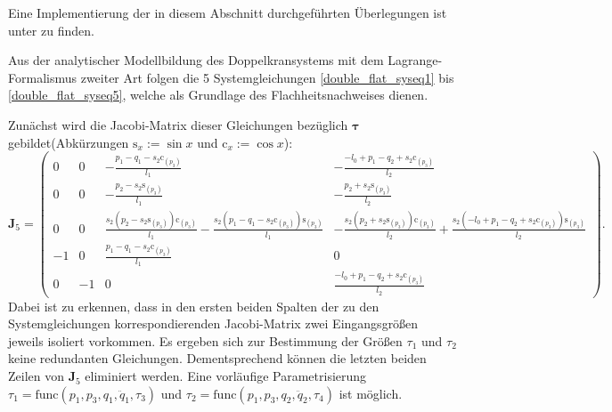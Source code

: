 Eine Implementierung der in diesem Abschnitt durchgeführten Überlegungen ist unter \cite[flatness\_notebooks/ODE\_flatness\_analysis.ipynb]{SAGithub} zu finden.

Aus der analytischer Modellbildung des Doppelkransystems mit dem Lagrange-Formalismus zweiter Art folgen die 5 Systemgleichungen \eqref{double_flat_syseq1} bis \eqref{double_flat_syseq5}, welche als Grundlage des Flachheitsnachweises dienen. 

Zunächst wird die Jacobi-Matrix dieser Gleichungen bezüglich $\boldsymbol{\tau}$ gebildet(Abkürzungen $\mathrm{s}_x := \sin{x}$ und $\mathrm{c}_x := \cos{x}$):
\begin{equation*}
	\mathbf{J}_5 = 
	\left(\begin{smallmatrix}
	0 & 0 & - \frac{p_{1} - q_{1} - s_{2} \mathrm{c}_{\left(p_{3} \right)}}{l_{1}} & - \frac{- l_{0} + p_{1} - q_{2} + s_{2} \mathrm{c}_{\left(p_{3} \right)}}{l_{2}}\\
	0 & 0 & - \frac{p_{2} - s_{2} \mathrm{s}_{\left(p_{3} \right)}}{l_{1}} & - \frac{p_{2} + s_{2} \mathrm{s}_{\left(p_{3} \right)}}{l_{2}}\\
	0 & 0 & \frac{s_{2} \left(p_{2} - s_{2} \mathrm{s}_{\left(p_{3} \right)}\right) \mathrm{c}_{\left(p_{3} \right)}}{l_{1}} - \frac{s_{2} \left(p_{1} - q_{1} - s_{2} \mathrm{c}_{\left(p_{3} \right)}\right) \mathrm{s}_{\left(p_{3} \right)}}{l_{1}} & - \frac{s_{2} \left(p_{2} + s_{2} \mathrm{s}_{\left(p_{3} \right)}\right) \mathrm{c}_{\left(p_{3} \right)}}{l_{2}} + \frac{s_{2} \left(- l_{0} + p_{1} - q_{2} + s_{2} \mathrm{c}_{\left(p_{3} \right)}\right) \mathrm{s}_{\left(p_{3} \right)}}{l_{2}}\\
	-1 & 0 & \frac{p_{1} - q_{1} - s_{2} \mathrm{c}_{\left(p_{3} \right)}}{l_{1}} & 0\\
	0 & -1 & 0 & \frac{- l_{0} + p_{1} - q_{2} + s_{2} \mathrm{c}_{\left(p_{3} \right)}}{l_{2}}
	\end{smallmatrix}\right).
\end{equation*}
Dabei ist zu erkennen, dass in den ersten beiden Spalten der zu den Systemgleichungen korrespondierenden Jacobi-Matrix zwei Eingangsgrößen jeweils isoliert vorkommen. Es ergeben sich zur Bestimmung der Größen $\tau_1$ und $\tau_2$ keine redundanten Gleichungen. Dementsprechend können die letzten beiden Zeilen von $\mathbf{J}_5$ eliminiert werden. Eine vorläufige Parametrisierung $\tau_1 = \mathrm{func}(p_1, p_3, q_1, \ddot{q}_1, \tau_3)$ und $\tau_2 = \mathrm{func}(p_1, p_3, q_2, \ddot{q}_2, \tau_4)$ ist möglich.

